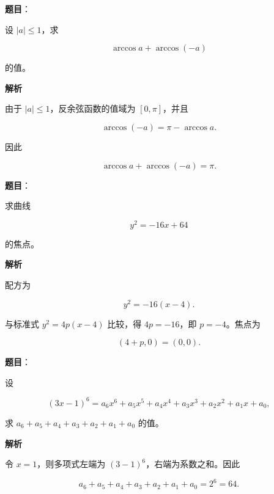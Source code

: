 \begin{answer}

\textbf{题目}：

设 $|a|\le1$，求

\nopagebreak[4]
\[
\arccos a+\arccos(-a)
\]

的值。

\textbf{解析}

由于 $|a|\le1$，反余弦函数的值域为 $[0,\pi]$，并且

\nopagebreak[4]
\[
\arccos(-a)=\pi-\arccos a.
\]

因此

\nopagebreak[4]
\[
\arccos a+\arccos(-a)=\pi.
\]


\end{answer}
\begin{answer}

\textbf{题目}：

求曲线

\nopagebreak[4]
\[
y^2=-16x+64
\]

的焦点。

\textbf{解析}

配方为

\nopagebreak[4]
\[
y^2=-16(x-4).
\]

与标准式 $y^2=4p(x-4)$ 比较，得 $4p=-16$，即 $p=-4$。焦点为

\nopagebreak[4]
\[
(4+p,0)=(0,0).
\]


\end{answer}
\begin{answer}

\textbf{题目}：

设

\nopagebreak[4]
\[
(3x-1)^6=a_6x^6+a_5x^5+a_4x^4+a_3x^3+a_2x^2+a_1x+a_0,
\]

求 $a_6+a_5+a_4+a_3+a_2+a_1+a_0$ 的值。

\textbf{解析}

令 $x=1$，则多项式左端为 $(3-1)^6$，右端为系数之和。因此

\nopagebreak[4]
\[
a_6+a_5+a_4+a_3+a_2+a_1+a_0=2^6=64.
\]


\end{answer}
